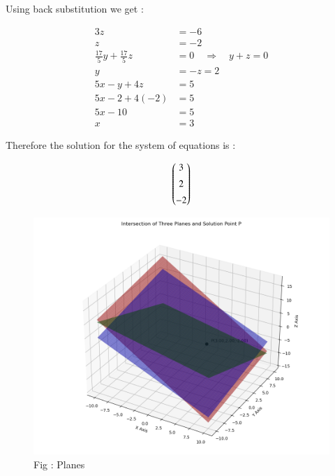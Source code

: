 \documentclass[journal,12pt,onecolumn]{IEEEtran}
\theoremstyle{remark}
\begin{document}
Using back substitution we get :

\begin{align}
  3z &= -6 \\
  z &= -2 \\
  \tfrac{17}{5}y + \tfrac{17}{5}z &= 0 \quad\Rightarrow\quad y+z=0\\
  y &= -z = 2\\
  5x - y + 4z &= 5\\
  5x - 2 + 4(-2) &= 5\\
  5x -10 &= 5\\
  x &= 3
\end{align}

\pagebreak

Therefore the solution for the system of equations is : 

\begin{align}
  \begin{pmatrix}3\\[0.5em]2\\[0.5em]-2\end{pmatrix}
\end{align}

\pagebreak

\begin{figure}[h!]
  \centering
  \includegraphics[width=0.9\columnwidth]{figs/Figure_1.png} 
   \caption*{Fig : Planes}
  \label{Fig1}
\end{figure}
\end{document}
